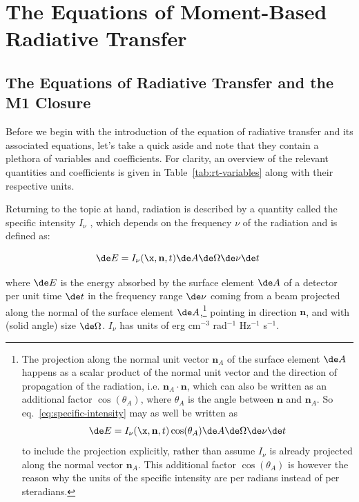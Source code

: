 \chapter{The Equations of Moment-Based Radiative Transfer}\label{chap:rt-equations}


\section{The Equations of Radiative Transfer and the M1 Closure}

Before we begin with the introduction of the equation of radiative transfer and its associated
equations, let's take a quick aside and note that they contain a plethora of variables and
coefficients. For clarity, an overview of the relevant quantities and coefficients is given in
Table~\ref{tab:rt-variables} along with their respective units.

Returning to the topic at hand, radiation is described by a quantity called the specific intensity
$I_\nu$ \citep[e.g.][]{mihalasFoundationsRadiationHydrodynamics1984,
teyssierTheoreticalAstrophysics2021}, which depends on the frequency $\nu$ of the radiation and is
defined as:

\begin{equation}
	\de E = I_\nu(\x, \mathbf{n}, t) \de A \de \Omega \de \nu \de t \  \label{eq:specific-intensity}
\end{equation}

where $\de E$ is the energy absorbed by the surface element $\de A$ of a detector per unit time
$\de t$ in the frequency range $\de \nu$ coming from a beam projected along the normal of
the surface element $\de A$,\footnote{
The projection along the normal unit vector $\mathbf{n}_A$ of the surface element $\de A$ happens
as a scalar product of the normal unit vector and the direction of propagation of the radiation,
i.e. $\mathbf{n}_A \cdot \mathbf{n}$, which can also be written as an additional factor
$\cos(\theta_A)$, where $\theta_A$ is the angle between $\mathbf{n}$ and $\mathbf{n}_A$. So
eq.~\ref{eq:specific-intensity} may as well be written as
\begin{equation*}
	\de E = I_\nu(\x, \mathbf{n}, t) \cos(\theta_A) \de A \de \Omega \de \nu \de t
\end{equation*} to include the projection explicitly, rather than assume $I_\nu$ is already
projected along the normal vector $\mathbf{n}_A$. This additional factor $\cos(\theta_A)$ is
however the reason why the units of the specific intensity are per radians instead of per
steradians.}
pointing in direction $\mathbf{n}$, and with (solid angle) size $\de \Omega$. $I_\nu$ has units of
erg cm$^{-3}$ rad$^{-1}$ Hz$^{-1}$ s$^{-1}$.


